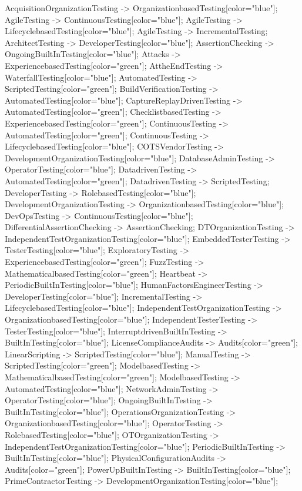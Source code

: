 \documentclass{article}
\begin{document}
{AcquisitionOrganizationTesting -> OrganizationbasedTesting[color="blue"];
AgileTesting -> ContinuousTesting[color="blue"];
AgileTesting -> LifecyclebasedTesting[color="blue"];
AgileTesting -> IncrementalTesting;
ArchitectTesting -> DeveloperTesting[color="blue"];
AssertionChecking -> OngoingBuiltInTesting[color="blue"];
Attacks -> ExperiencebasedTesting[color="green"];
AttheEndTesting -> WaterfallTesting[color="blue"];
AutomatedTesting -> ScriptedTesting[color="green"];
BuildVerificationTesting -> AutomatedTesting[color="blue"];
CaptureReplayDrivenTesting -> AutomatedTesting[color="green"];
ChecklistbasedTesting -> ExperiencebasedTesting[color="green"];
ContinuousTesting -> AutomatedTesting[color="green"];
ContinuousTesting -> LifecyclebasedTesting[color="blue"];
COTSVendorTesting -> DevelopmentOrganizationTesting[color="blue"];
DatabaseAdminTesting -> OperatorTesting[color="blue"];
DatadrivenTesting -> AutomatedTesting[color="green"];
DatadrivenTesting -> ScriptedTesting;
DeveloperTesting -> RolebasedTesting[color="blue"];
DevelopmentOrganizationTesting -> OrganizationbasedTesting[color="blue"];
DevOpsTesting -> ContinuousTesting[color="blue"];
DifferentialAssertionChecking -> AssertionChecking;
DTOrganizationTesting -> IndependentTestOrganizationTesting[color="blue"];
EmbeddedTesterTesting -> TesterTesting[color="blue"];
ExploratoryTesting -> ExperiencebasedTesting[color="green"];
FuzzTesting -> MathematicalbasedTesting[color="green"];
Heartbeat -> PeriodicBuiltInTesting[color="blue"];
HumanFactorsEngineerTesting -> DeveloperTesting[color="blue"];
IncrementalTesting -> LifecyclebasedTesting[color="blue"];
IndependentTestOrganizationTesting -> OrganizationbasedTesting[color="blue"];
IndependentTesterTesting -> TesterTesting[color="blue"];
InterruptdrivenBuiltInTesting -> BuiltInTesting[color="blue"];
LicenseComplianceAudits -> Audits[color="green"];
LinearScripting -> ScriptedTesting[color="blue"];
ManualTesting -> ScriptedTesting[color="green"];
ModelbasedTesting -> MathematicalbasedTesting[color="green"];
ModelbasedTesting -> AutomatedTesting[color="blue"];
NetworkAdminTesting -> OperatorTesting[color="blue"];
OngoingBuiltInTesting -> BuiltInTesting[color="blue"];
OperationsOrganizationTesting -> OrganizationbasedTesting[color="blue"];
OperatorTesting -> RolebasedTesting[color="blue"];
OTOrganizationTesting -> IndependentTestOrganizationTesting[color="blue"];
PeriodicBuiltInTesting -> BuiltInTesting[color="blue"];
PhysicalConfigurationAudits -> Audits[color="green"];
PowerUpBuiltInTesting -> BuiltInTesting[color="blue"];
PrimeContractorTesting -> DevelopmentOrganizationTesting[color="blue"];
}
\end{document}
